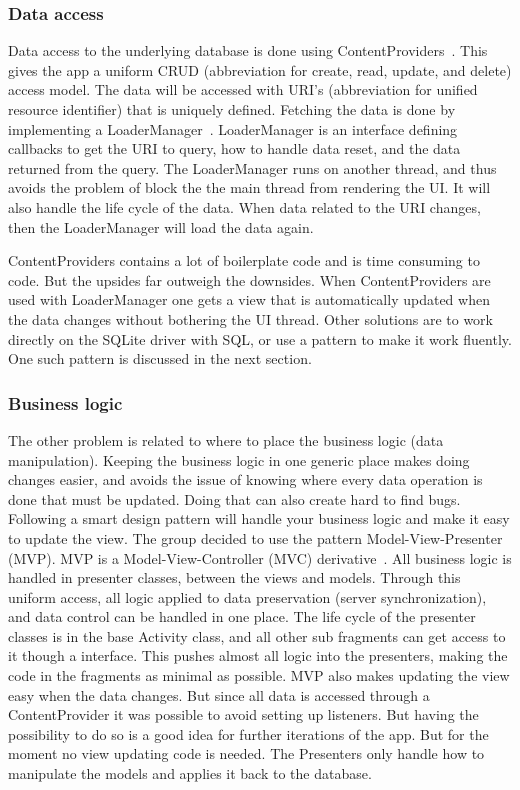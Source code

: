 \subsubsection{Data access}

Data access to the underlying database is done using ContentProviders~\cite{contentproviders}. This gives the app a uniform \gls{CRUD} (abbreviation for create, read, update, and delete) access model. The data will be accessed with \gls{URI}'s (abbreviation for unified resource identifier) that is uniquely defined. Fetching the data is done by implementing a LoaderManager~\cite{loadermanager}. LoaderManager is an interface defining callbacks to get the URI to query, how to handle data reset, and the data returned from the query. The LoaderManager runs on another thread, and thus avoids the problem of block the the main thread from rendering the UI. It will also handle the life cycle of the data. When data related to the URI changes, then the LoaderManager will load the data again. 

ContentProviders contains a lot of boilerplate code and is time consuming to code. But the upsides far outweigh the downsides. When ContentProviders are used with LoaderManager one gets a view that is automatically updated when the data changes without bothering the UI thread. Other solutions are to work directly on the SQLite driver with SQL, or use a pattern to make it work fluently. One such pattern is discussed in the next section. 

\subsubsection{Business logic}

The other problem is related to where to place the business logic (data manipulation). Keeping the business logic in one generic place makes doing changes easier, and avoids the issue of knowing where every data operation is done that must be updated. Doing that can also create hard to find bugs. Following a smart design pattern will handle your business logic and make it easy to update the view. 
The group decided to use the pattern Model-View-Presenter (MVP). MVP is a Model-View-Controller (MVC) derivative~\cite{mvc}. All business logic is handled in presenter classes, between the views and models. Through this uniform access, all logic applied to data preservation (server synchronization), and data control can be handled in one place. The life cycle of the presenter classes is in the base Activity class, and all other sub fragments can get access to it though a interface. 
This pushes almost all logic into the presenters, making the code in the fragments as minimal as possible. 
MVP also makes updating the view easy when the data changes. But since all data is accessed through a ContentProvider it was possible to avoid setting up listeners. But having the possibility to do so is a good idea for further iterations of the app. But for the moment no view updating code is needed. The Presenters only handle how to manipulate the models and applies it back to the database.

